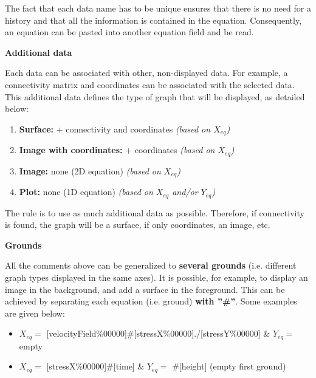 \documentclass{article}
\begin{document}
The fact that each data name has to be unique ensures that there is no need for a history and that all the information is contained in the equation. Consequently, an equation can be pasted into another equation field and be read.
\newline

\textbf{Additional data}\newline

\par
Each data can be associated with other, non-displayed data. For example, a connectivity matrix and coordinates can be associated with the selected data. This additional data defines the type of graph that will be displayed, as detailed below:

\begin{enumerate}
    \item \textbf{Surface:} + connectivity and coordinates \textit{(based on $X_{eq}$)}
    \item \textbf{Image with coordinates:} + coordinates \textit{(based on $X_{eq}$)}
    \item \textbf{Image:} none (2D equation) \textit{(based on $X_{eq}$)}
    \item \textbf{Plot:} none (1D equation) \textit{(based on $X_{eq}$ and/or $Y_{eq}$)}
\end{enumerate}

The rule is to use as much additional data as possible. Therefore, if connectivity is found, the graph will be a surface, if only coordinates, an image, etc.
\newline

\textbf{Grounds}\newline

\par
All the comments above can be generalized to \textbf{several grounds} (i.e. different graph types displayed in the same axes). It is possible, for example, to display an image in the background, and add a surface in the foreground. This can be achieved by separating each equation (i.e. ground) \textbf{with ''\#''}. Some examples are given below:

\begin{itemize}
    \item $X_{eq}=$ [velocityField\%00000]\#[stressX\%00000]./[stressY\%00000] \& $Y_{eq}=$ empty
    \item $X_{eq}=$ [stressX\%00000]\#[time] \& 
    $Y_{eq}=$ \#[height] (empty first ground)
\end{itemize}
\end{document}
